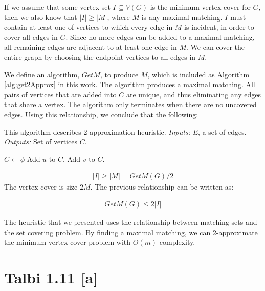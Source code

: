 \documentclass[12pt]{article}
\begin{document}
If we assume that some vertex set $I \subseteq V(G)$ is the minimum vertex cover for $G$, then we also know that $|I| \geq |M|$, where $M$ is any maximal matching. $I$ must contain at least one of vertices to which every edge in $M$ is incident, in order to cover all edges in $G$. Since no more edges can be added to a maximal matching, all remaining edges are adjacent to at least one edge in $M$. We can cover the entire graph by choosing the endpoint vertices to all edges in $M$.

We define an algorithm, $GetM$, to produce $M$, which is included as Algorithm \ref{alg:get2Approx} in this work. The algorithm produces a maximal matching. All pairs of vertices that are added into $C$ are unique, and thus eliminating any edges that share a vertex. The algorithm only terminates when there are no uncovered edges. Using this relationship, we conclude that the following:


\begin{algorithm}[ht!]
	\caption{This algorithm describes 2-approximation heuristic. \textit{Inputs:} $E$, a set of edges.
		\textit{Outputs:} Set of vertices $C$.} 
	\begin{algorithmic}[1]
		
		
		\State $C \gets \phi$ 
		 
		\State Add $u$ to $C$.
		\State Add $v$ to $C$.
		\EndWhile
		\EndProcedure
		
	\end{algorithmic}	
	\label{alg:get2Approx}
\end{algorithm}



\begin{align*}
|I|  \geq |M| = GetM(G) / 2
\end{align*}
The vertex cover is size $2M$. The previous relationship can be written as:

\begin{align*}
GetM(G) \leq 2 |I|
\end{align*}

The heuristic that we presented uses the relationship between matching sets and the set covering problem. By finding a maximal matching, we can 2-approximate the minimum vertex cover problem with $O(m)$ complexity.



\section{Talbi 1.11 [a]}
\end{document}
